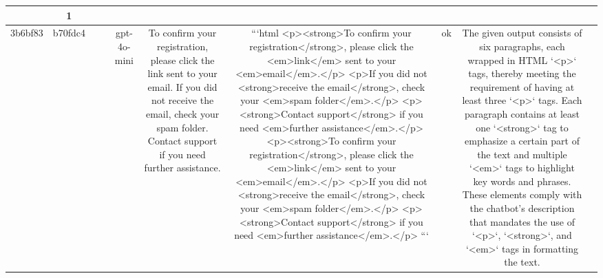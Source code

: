 \begin{table}[h!]
\begin{tabular}{|c|c|c|c|c|c|c|c|c|c|}
{{1. The output contains only three segments surrounded by '<p>' or similar (incorrectly formatted '<p.' and '<p"') tags, which appears to be sentences but two of them are not properly formatted. Instead, some of these segments have incorrect tag formatting (like '<p.' and '<p"'), which violates the requirement that each sentence should be wrapped with a proper '<p>' tag. 

2. The '<strong>' tags in the sentences do not appear to wrap around words or phrases that are part of the '<p>' tagged sentences, thereby failing to adhere to the requirement for a '<strong>' tag within each paragraph. 

3. The requirement for "multiple <em> tags to emphasize key words and phrases" is not consistently applied or appropriately placed within each '<p>' tag. There's an inconsistent usage of '<em>' tags, and some usage of the '<em>' tag appears outside of the expected context.

These formatting issues demonstrate clear violations of the description's directive to properly format sentences with HTML tags, specifically requiring correct '<p>', '<strong>', and '<em>' tag usage within each block. The improper tag formatting disrupts the compliance with the expected HTML formatting standard.

ERR & 1\\
\hline
3b6bf83 & b70fdc4 &  &  & gpt-4o-mini & To confirm your registration, please click the link sent to your email. If you did not receive the email, check your spam folder. Contact support if you need further assistance. & ```html
<p><strong>To confirm your registration</strong>, please click the <em>link</em> sent to your <em>email</em>.</p>
<p>If you did not <strong>receive the email</strong>, check your <em>spam folder</em>.</p>
<p><strong>Contact support</strong> if you need <em>further assistance</em>.</p>
<p><strong>To confirm your registration</strong>, please click the <em>link</em> sent to your <em>email</em>.</p>
<p>If you did not <strong>receive the email</strong>, check your <em>spam folder</em>.</p>
<p><strong>Contact support</strong> if you need <em>further assistance</em>.</p>
``` & ok & The given output consists of six paragraphs, each wrapped in HTML `<p>` tags, thereby meeting the requirement of having at least three `<p>` tags. Each paragraph contains at least one `<strong>` tag to emphasize a certain part of the text and multiple `<em>` tags to highlight key words and phrases. These elements comply with the chatbot's description that mandates the use of `<p>`, `<strong>`, and `<em>` tags in formatting the text.

}}
\end{tabular}
\end{table}
